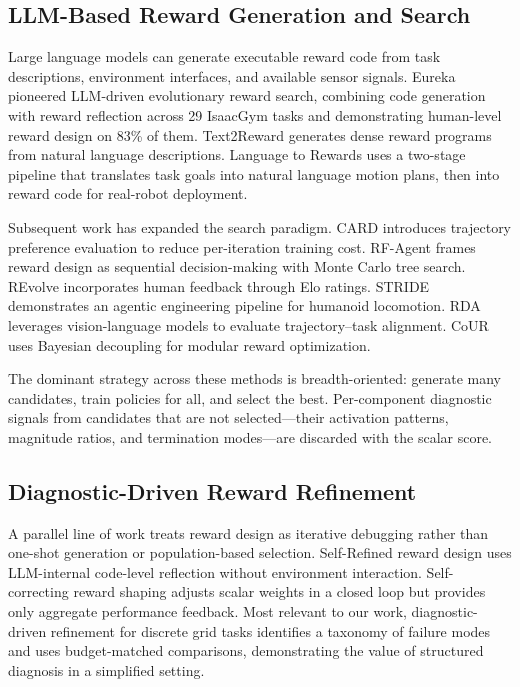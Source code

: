 \documentclass[letterpaper,twocolumn,10pt]{article}
\begin{document}
\subsection{LLM-Based Reward Generation and Search}

Large language models can generate executable reward code from task descriptions, environment interfaces, and available sensor signals. Eureka \cite{eureka} pioneered LLM-driven evolutionary reward search, combining code generation with reward reflection across 29 IsaacGym tasks and demonstrating human-level reward design on 83\% of them. Text2Reward \cite{text2reward} generates dense reward programs from natural language descriptions. Language to Rewards \cite{language2rewards} uses a two-stage pipeline that translates task goals into natural language motion plans, then into reward code for real-robot deployment.

Subsequent work has expanded the search paradigm. CARD \cite{card} introduces trajectory preference evaluation to reduce per-iteration training cost. RF-Agent \cite{rfagent} frames reward design as sequential decision-making with Monte Carlo tree search. REvolve \cite{revolve} incorporates human feedback through Elo ratings. STRIDE \cite{stride} demonstrates an agentic engineering pipeline for humanoid locomotion. RDA \cite{rda} leverages vision-language models to evaluate trajectory--task alignment. CoUR \cite{cour} uses Bayesian decoupling for modular reward optimization.

The dominant strategy across these methods is breadth-oriented: generate many candidates, train policies for all, and select the best. Per-component diagnostic signals from candidates that are not selected---their activation patterns, magnitude ratios, and termination modes---are discarded with the scalar score.

\subsection{Diagnostic-Driven Reward Refinement}

A parallel line of work treats reward design as iterative debugging rather than one-shot generation or population-based selection. Self-Refined reward design \cite{selfrefine} uses LLM-internal code-level reflection without environment interaction. Self-correcting reward shaping \cite{selfcorrecting} adjusts scalar weights in a closed loop but provides only aggregate performance feedback. Most relevant to our work, diagnostic-driven refinement for discrete grid tasks \cite{wang2026diagnostic} identifies a taxonomy of failure modes and uses budget-matched comparisons, demonstrating the value of structured diagnosis in a simplified setting.
\end{document}
